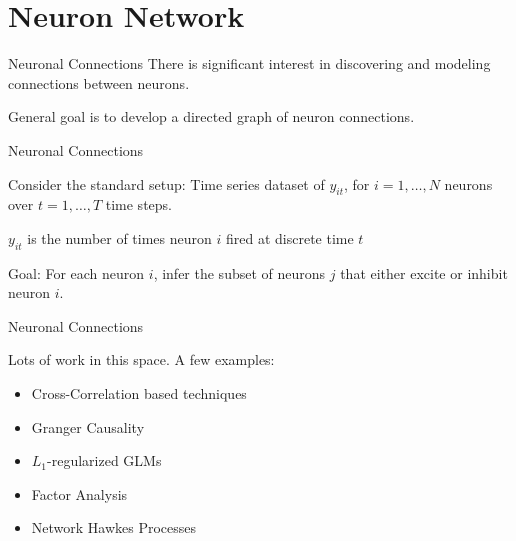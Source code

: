 \documentclass[xcolor=svgnames]{beamer}
\title[\shorttitle]{\maintitle}
\subtitle{\sbtitle}
\author[\sauthors]{\lauthors\\ \scriptsize{\em \home}}
\institute{\venue\\ \tiny{\location}}
\date[\sdate]{\scriptsize{\ldate}}
\begin{document}
\begin{frame}[plain]
	\titlepage
\end{frame}

\section{Neuron Network}
\begin{frame}{Neuronal Connections}
	There is significant interest in discovering and modeling connections
between neurons.

	General goal is to develop a directed graph of neuron connections. 

\end{frame}
\begin{frame}{Neuronal Connections}

	\begin{block}{Consider the standard setup:}
	Time series dataset of $y_{it}$, for $i=1,\ldots,N$ neurons over $t=1,\ldots,T$ time steps.

	$y_{it}$ is the number of times neuron $i$ fired at discrete time $t$ 
	\end{block}

	\begin{block}{Goal:}
	For each neuron $i$, infer the subset of neurons $j$ that either excite or inhibit neuron $i$. 
	\end{block}


\end{frame}

\begin{frame}{Neuronal Connections}
	\begin{block}{Lots of work in this space. A few examples:}
	\begin{itemize}
	\item Cross-Correlation based techniques
	\item Granger Causality
	\item $L_1$-regularized GLMs
	\item Factor Analysis
	\item Network Hawkes Processes
	\end{itemize}
	\end{block}
\end{frame}

\end{document}

